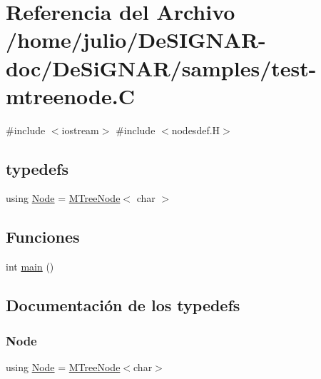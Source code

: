 \hypertarget{test-mtreenode_8_c}{}\section{Referencia del Archivo /home/julio/\+De\+S\+I\+G\+N\+A\+R-\/doc/\+De\+Si\+G\+N\+A\+R/samples/test-\/mtreenode.C}
\label{test-mtreenode_8_c}
{\ttfamily \#include $<$iostream$>$}\newline
{\ttfamily \#include $<$nodesdef.\+H$>$}\newline
\subsection*{typedefs}
\begin{DoxyCompactItemize}
\item 
using \hyperlink{test-mtreenode_8_c_a17a24b0725f59987143c5faf63c4dc6f}{Node} = \hyperlink{class_designar_1_1_m_tree_node}{M\+Tree\+Node}$<$ char $>$
\end{DoxyCompactItemize}
\subsection*{Funciones}
\begin{DoxyCompactItemize}
\item 
int \hyperlink{test-mtreenode_8_c_ae66f6b31b5ad750f1fe042a706a4e3d4}{main} ()
\end{DoxyCompactItemize}


\subsection{Documentación de los \textquotesingle{}typedefs\textquotesingle{}}
\mbox{\label{test-mtreenode_8_c_a17a24b0725f59987143c5faf63c4dc6f}} 
\subsubsection{\texorpdfstring{Node}{Node}}
{\footnotesize\ttfamily using \hyperlink{namespace_designar_a5af326c65aa2bd26b26c410f2030d09e}{Node} =  \hyperlink{class_designar_1_1_m_tree_node}{M\+Tree\+Node}$<$char$>$}



